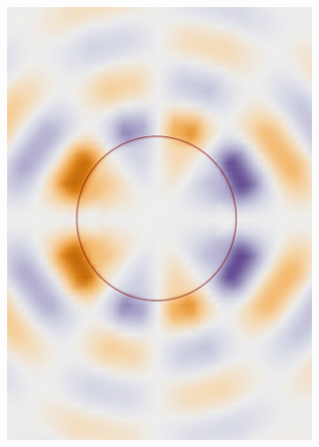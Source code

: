 \begin{figure}%
\begin{subfigure}{0.53\textwidth}
   \includegraphics[width=\textwidth]{Figures/BC/plane_fin}
   \caption{}
   \label{fig:cutInfa}
\end{subfigure}
\begin{subfigure}{0.47\textwidth}

\end{subfigure}
\end{figure}
